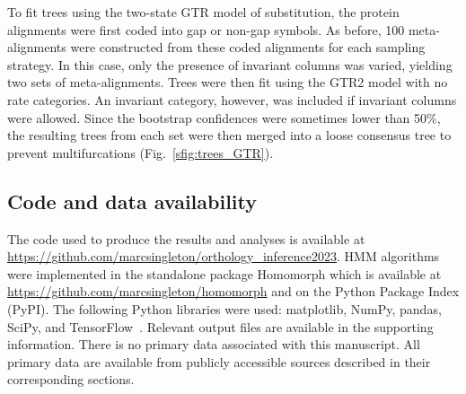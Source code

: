 To fit trees using the two-state GTR model of substitution, the protein alignments were first coded into gap or non-gap symbols. As before, 100 meta-alignments were constructed from these coded alignments for each sampling strategy. In this case, only the presence of invariant columns was varied, yielding two sets of meta-alignments. Trees were then fit using the GTR2 model with no rate categories. An invariant category, however, was included if invariant columns were allowed. Since the bootstrap confidences were sometimes lower than 50\%, the resulting trees from each set were then merged into a loose consensus tree to prevent multifurcations (Fig.~\ref{sfig:trees_GTR}).

\subsection*{Code and data availability}
\begin{sloppypar}
The code used to produce the results and analyses is available at \url{https://github.com/marcsingleton/orthology_inference2023}. HMM algorithms were implemented in the standalone package Homomorph which is available at \url{https://github.com/marcsingleton/homomorph} and on the Python Package Index (PyPI). The following Python libraries were used: matplotlib, NumPy, pandas, SciPy, and TensorFlow~\cite{Hunter2007, Harris2020, McKinney2010, Virtanen2020, Abadi2015}. Relevant output files are available in the supporting information. There is no primary data associated with this manuscript. All primary data are available from publicly accessible sources described in their corresponding sections.
\end{sloppypar}
